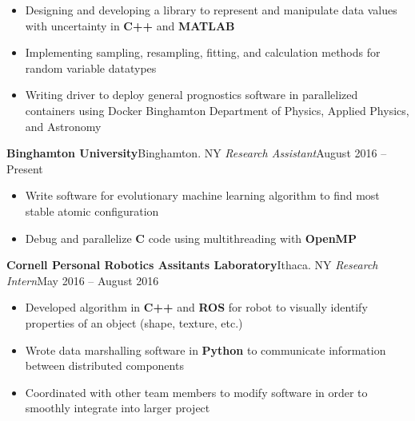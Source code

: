 \documentclass[11pt]{article}
\begin{document}
\begin{itemize}
	\item Designing and developing a library to represent and manipulate data values with uncertainty in \textbf{C++} and \textbf{MATLAB}
	\item Implementing sampling, resampling, fitting, and calculation methods for random variable datatypes
	\item Writing driver to deploy general prognostics software in parallelized containers using Docker Binghamton Department of Physics, Applied Physics, and Astronomy
\end{itemize}
\textbf{Binghamton University}\hfill Binghamton. NY
\textit{Research Assistant}\hfill August 2016 – Present
\begin{itemize}
	\item Write software for evolutionary machine learning algorithm to find most stable atomic configuration
	\item Debug and parallelize \textbf{C} code using multithreading with \textbf{OpenMP}
\end{itemize}
\textbf{Cornell Personal Robotics Assitants Laboratory}\hfill Ithaca. NY
\textit{Research Intern}\hfill May 2016 – August 2016
\begin{itemize}
	\item Developed algorithm in \textbf{C++} and \textbf{ROS} for robot to visually identify properties of an object (shape, texture, etc.)
	\item Wrote data marshalling software in \textbf{Python} to communicate information between distributed components
	\item Coordinated with other team members to modify software in order to smoothly integrate into larger project
\end{itemize}
\vspace{4mm}
\end{document}
